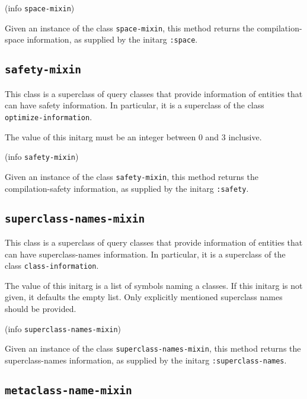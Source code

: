  {(info {\tt space-mixin})}

Given an instance of the class \texttt{space-mixin}, this method
returns the compilation-space information, as supplied by the initarg
\texttt{:space}.

\subsection{\texttt{safety-mixin}}
\label{sec-safety-mixin}

This class is a superclass of query classes that provide information
of entities that can have safety information.  In particular, it is a
superclass of the class \texttt{optimize-information}.


The value of this initarg must be an integer between $0$ and $3$
inclusive.

 {(info {\tt safety-mixin})}

Given an instance of the class \texttt{safety-mixin}, this method
returns the compilation-safety information, as supplied by the initarg
\texttt{:safety}.

\subsection{\texttt{superclass-names-mixin}}
\label{sec-superclass-names-mixin}

This class is a superclass of query classes that provide information
of entities that can have superclass-names information.  In
particular, it is a superclass of the class \texttt{class-information}.


The value of this initarg is a list of symbols naming a classes.  If
this initarg is not given, it defaults the empty list.  Only
explicitly mentioned superclass names should be provided.

 {(info {\tt superclass-names-mixin})}

Given an instance of the class \texttt{superclass-names-mixin}, this
method returns the superclass-names information, as supplied by the
initarg \texttt{:superclass-names}.

\subsection{\texttt{metaclass-name-mixin}}
\label{sec-metaclass-name-mixin}

